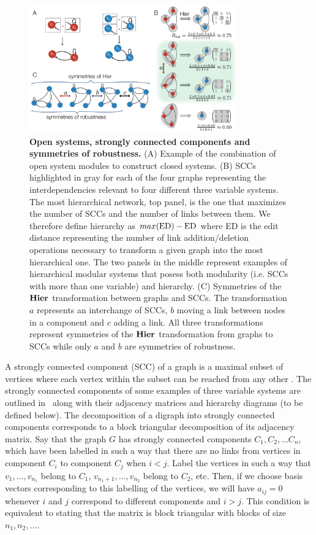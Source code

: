 \begin{figure}[!ht]
\centering
\noindent\includegraphics[width=0.8\textwidth]{fig/modsccsym.pdf}
\caption{{\bf Open systems, strongly connected components and symmetries of robustness.} (A) Example of the combination of open system modules to construct closed systems. (B) SCCs highlighted in gray for each of the four graphs representing the interdependencies relevant to four different three variable systems. The most hierarchical network, top panel, is the one that maximizes the number of SCCs and the number of links between them. We therefore define hierarchy as $max(\hbox{ED}) - \hbox{ED}$ where ED is the edit distance representing the number of link addition/deletion operations necessary to transform a given graph into the most hierarchical one. The two panels in the middle represent examples of hierarchical modular systems that posess both modularity (i.e. SCCs with more than one variable) and hierarchy. (C) Symmetries of the $\mathbf{Hier}$ transformation between graphs and SCCs. The transformation $a$ represents an interchange of SCCs, $b$ moving a link between nodes in a component and $c$ adding a link. All three transformations represent symmetries of the $\mathbf{Hier}$ transformation from graphs to SCCs while only $a$ and $b$ are symmetries of robustness.}
\label{fig:modsccsym}
\end{figure}

A strongly connected component (SCC) of a graph is a maximal subset of vertices where each vertex within the subset can be reached from any other \cite{Cormen2009}. The strongly connected components of some examples of three variable systems are outlined in $\,$ along with their adjacency matrices and hierarchy diagrams (to be defined below).
The decomposition of a digraph into strongly connected components corresponds to a block triangular decomposition of its adjacency matrix.  Say that the graph $G$ has strongly connected components $C_1, C_2, \ldots C_n$, which have been labelled in such a way that there are no links from vertices in component $C_i$ to component $C_j$ when $i < j$.  Label the vertices in such a way that $v_1, \ldots, v_{n_1}$ belong to $C_1$, $v_{n_1 + 1}, \ldots, v_{n_2}$ belong to $C_2$, etc.  Then, if we choose basis vectors corresponding to this labelling of the vertices, we will have $a_{ij} = 0$ whenever $i$ and $j$ correspond to different components and $i > j$.  This condition is equivalent to stating that the matrix is block triangular with blocks of size $n_1, n_2, \ldots$.

